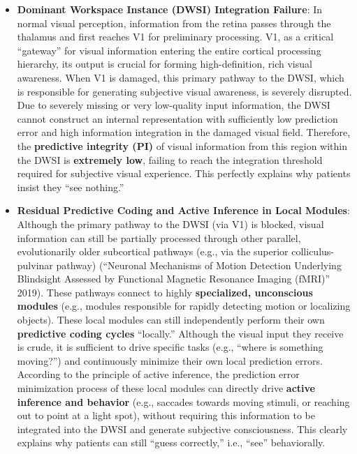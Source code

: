 \documentclass[
  a4paper]{article}
\begin{document}
\begin{itemize}
\item
  \textbf{Dominant Workspace Instance (DWSI) Integration Failure}: In
  normal visual perception, information from the retina passes through
  the thalamus and first reaches V1 for preliminary processing. V1, as a
  critical ``gateway'' for visual information entering the entire
  cortical processing hierarchy, its output is crucial for forming
  high-definition, rich visual awareness. When V1 is damaged, this
  primary pathway to the DWSI, which is responsible for generating
  subjective visual awareness, is severely disrupted. Due to severely
  missing or very low-quality input information, the DWSI cannot
  construct an internal representation with sufficiently low prediction
  error and high information integration in the damaged visual field.
  Therefore, the \textbf{predictive integrity (PI)} of visual
  information from this region within the DWSI is \textbf{extremely
  low}, failing to reach the integration threshold required for
  subjective visual experience. This perfectly explains why patients
  insist they ``see nothing.''
\item
  \textbf{Residual Predictive Coding and Active Inference in Local
  Modules}: Although the primary pathway to the DWSI (via V1) is
  blocked, visual information can still be partially processed through
  other parallel, evolutionarily older subcortical pathways (e.g., via
  the superior colliculus-pulvinar pathway) ({``Neuronal Mechanisms of
  Motion Detection Underlying Blindsight Assessed by Functional Magnetic
  Resonance Imaging ({fMRI})''} 2019). These pathways connect to highly
  \textbf{specialized, unconscious modules} (e.g., modules responsible
  for rapidly detecting motion or localizing objects). These local
  modules can still independently perform their own \textbf{predictive
  coding cycles} ``locally.'' Although the visual input they receive is
  crude, it is sufficient to drive specific tasks (e.g., ``where is
  something moving?'') and continuously minimize their own local
  prediction errors. According to the principle of active inference, the
  prediction error minimization process of these local modules can
  directly drive \textbf{active inference and behavior} (e.g., saccades
  towards moving stimuli, or reaching out to point at a light spot),
  without requiring this information to be integrated into the DWSI and
  generate subjective consciousness. This clearly explains why patients
  can still ``guess correctly,'' i.e., ``see'' behaviorally.
\end{itemize}
\end{document}
